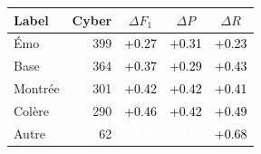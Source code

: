 \begin{tabular}{lrccc}
\toprule
\textbf{Label} & \textbf{Cyber} & \textbf{$\Delta F_1$} & \textbf{$\Delta P$} & \textbf{$\Delta R$} \\
\midrule
Émo & 399 & \cellcolor[HTML]{C7EA97}\textcolor{black}{+0.27} & \cellcolor[HTML]{CFEB8F}\textcolor{black}{+0.31} & \cellcolor[HTML]{C0EAA1}\textcolor{black}{+0.23} \\
Base & 364 & \cellcolor[HTML]{E6EC7E}\textcolor{black}{+0.37} & \cellcolor[HTML]{CBEA92}\textcolor{black}{+0.29} & \cellcolor[HTML]{EEDA6E}\textcolor{black}{+0.43} \\
Montrée & 301 & \cellcolor[HTML]{EEE172}\textcolor{black}{+0.42} & \cellcolor[HTML]{EEDF71}\textcolor{black}{+0.42} & \cellcolor[HTML]{EEE373}\textcolor{black}{+0.41} \\
Colère & 290 & \cellcolor[HTML]{EFCD67}\textcolor{black}{+0.46} & \cellcolor[HTML]{EEDF71}\textcolor{black}{+0.42} & \cellcolor[HTML]{F1BB5E}\textcolor{black}{+0.49} \\
Autre & 62 & \cellcolor[HTML]{E4602C}\textcolor{white}{+0.76} & \cellcolor[HTML]{E25727}\textcolor{white}{+0.78} & \cellcolor[HTML]{E97B39}\textcolor{black}{+0.68} \\
\bottomrule
\end{tabular}
